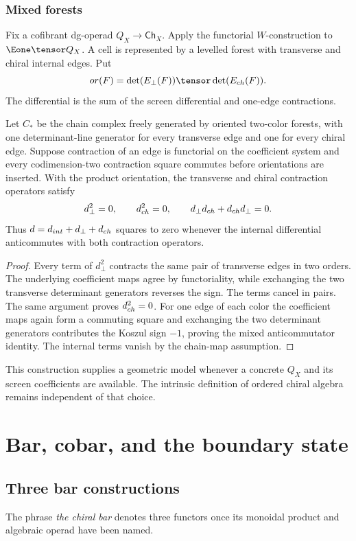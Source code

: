 \section{Mixed forests}
Fix a cofibrant dg-operad $Q_X\to\mathsf{Ch}_X$. Apply the functorial $W$-construction to $\Eone\tensor Q_X$. A cell is represented by a levelled forest with transverse and chiral internal edges. Put
\[
 \operatorname{or}(F)=\det(E_\perp(F))\tensor\det(E_{\ch}(F)).
\]
The differential is the sum of the screen differential and one-edge contractions.

\begin{theorem}
Let $C_*$ be the chain complex freely generated by oriented two-color forests, with one determinant-line generator for every transverse edge and one for every chiral edge.  Suppose contraction of an edge is functorial on the coefficient system and every codimension-two contraction square commutes before orientations are inserted.  With the product orientation, the transverse and chiral contraction operators satisfy
\[
 d_\perp^2=0,\qquad d_{ch}^2=0,\qquad
 d_\perp d_{ch}+d_{ch}d_\perp=0.
\]
Thus $d=d_{int}+d_\perp+d_{ch}$ squares to zero whenever the internal differential anticommutes with both contraction operators.
\end{theorem}
\begin{proof}
Every term of $d_\perp^2$ contracts the same pair of transverse edges in two orders.  The underlying coefficient maps agree by functoriality, while exchanging the two transverse determinant generators reverses the sign.  The terms cancel in pairs.  The same argument proves $d_{ch}^2=0$.  For one edge of each color the coefficient maps again form a commuting square and exchanging the two determinant generators contributes the Koszul sign $-1$, proving the mixed anticommutator identity.  The internal terms vanish by the chain-map assumption.
\end{proof}

This construction supplies a geometric model whenever a concrete $Q_X$ and its screen coefficients are available. The intrinsic definition of ordered chiral algebra remains independent of that choice.

\part{Bar, cobar, and the boundary state}


\chapter{Three bar constructions}
The phrase \emph{the chiral bar} denotes three functors once its monoidal product and algebraic operad have been named.

